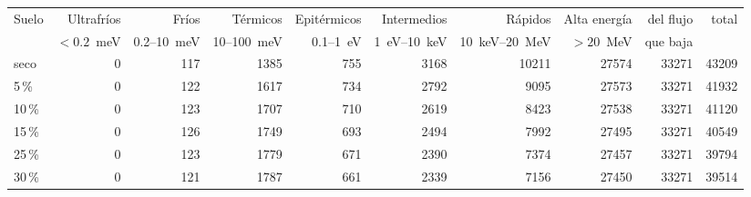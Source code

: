 \begin{tabular}{lrrrrrrrrr}
\toprule
Suelo & Ultrafríos & Fríos & Térmicos & Epitérmicos & Intermedios & Rápidos & Alta energía & del flujo & total \\
 & \scriptsize $<0.2$~meV & \scriptsize 0.2--10~meV & \scriptsize 10--100~meV & \scriptsize 0.1--1~eV & \scriptsize 1~eV--10~keV & \scriptsize 10~keV--20~MeV & \scriptsize $>20$~MeV & que baja & \\
\midrule
seco & 0 & 117 & 1385 & 755 & 3168 & 10211 & 27574 & 33271 & 43209 \\
5\,\% & 0 & 122 & 1617 & 734 & 2792 & 9095 & 27573 & 33271 & 41932 \\
10\,\% & 0 & 123 & 1707 & 710 & 2619 & 8423 & 27538 & 33271 & 41120 \\
15\,\% & 0 & 126 & 1749 & 693 & 2494 & 7992 & 27495 & 33271 & 40549 \\
25\,\% & 0 & 123 & 1779 & 671 & 2390 & 7374 & 27457 & 33271 & 39794 \\
30\,\% & 0 & 121 & 1787 & 661 & 2339 & 7156 & 27450 & 33271 & 39514 \\
\bottomrule
\end{tabular}
